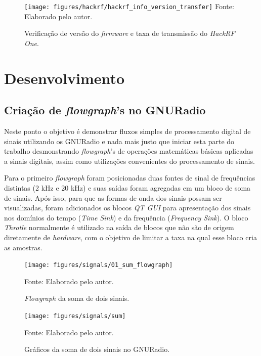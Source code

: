 \documentclass[
  12pt,				%
  openright,			%
  twoside,			%
  a4paper,			%
  english,			%
  french,				%
  spanish,			%
  brazil,				%
  ]{abntex2}
\begin{document}
\begin{figure}[!htb]
  \centering
  \caption{Verificação de versão do \textit{firmware} e taxa de transmissão do \textit{HackRF One}.}
  \texttt{[image: figures/hackrf/hackrf\_info\_version\_transfer]}
  Fonte: Elaborado pelo autor.
  \label{fig:hackrf_info}
\end{figure}
\part{Desenvolvimento}

\chapter{Criação de \textit{flowgraph}'s no GNURadio} \label{chapter:flowgraphs}

Neste ponto o objetivo é demonstrar fluxos simples de processamento digital de sinais utilizando os GNURadio e nada mais justo que iniciar esta parte
do trabalho desmonstrando \textit{flowgraph}'s de operações matemáticas básicas aplicadas a sinais digitais, assim como utilizações convenientes do processamento de sinais.

Para o primeiro \textit{flowgraph} foram posicionadas duas fontes de sinal de frequências distintas (2 kHz e 20 kHz) e suas saídas foram agregadas em um bloco de soma de sinais. Após isso,
para que as formas de onda dos sinais possam ser visualizadas, foram adicionados os blocos \textit{QT GUI} para apresentação dos sinais nos domínios do tempo
(\textit{Time Sink}) e da frequência (\textit{Frequency Sink}). O bloco \textit{Throtle} normalmente é utilizado na saída de blocos que não são de origem
diretamente de \textit{hardware}, com o objetivo de limitar a taxa na qual esse bloco cria as amostras.

\begin{figure}[!htb]
  \centering
  \caption{\textit{Flowgraph} da soma de dois sinais.}
  \texttt{[image: figures/signals/01\_sum\_flowgraph]}

  Fonte: Elaborado pelo autor.
  \label{fig:gnuradio_sum_flowgraph}
\end{figure}

\begin{figure}[!htb]
  \centering
  \caption{Gráficos da soma de dois sinais no GNURadio.}
  \texttt{[image: figures/signals/sum]}

  Fonte: Elaborado pelo autor.
  \label{fig:gnuradio_sum}
\end{figure}
\end{document}
